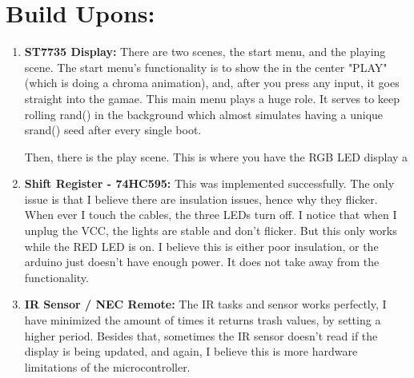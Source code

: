 \documentclass[12pt]{article}
\begin{document}
\section{Build Upons:}
\begin{enumerate}
  \item \textbf{ST7735 Display:}
    There are two scenes, the start menu, and the playing scene.
    The start menu's functionality is to show the in the center "PLAY"
    (which is doing a chroma animation),
    and, after you press any input, it goes straight into the gamae.
    This main menu plays a huge role. It serves to keep rolling rand()
    in the background which almost simulates having
    a unique srand() seed after every single boot.

    Then, there is the play scene. This is where you have the RGB LED
    display a
  \item \textbf{Shift Register - 74HC595:} This was implemented successfully.
    The only issue is that I believe there are insulation issues, hence why they flicker.
    When ever I touch the cables, the three LEDs turn off.
    I notice that when I unplug the VCC, the lights are stable and don't flicker.
    But this only works while the RED LED is on.
    I believe this is either poor insulation, or the arduino
    just doesn't have enough power. It does not take away from the functionality.
  \item \textbf{IR Sensor / NEC Remote:}
    The IR tasks and sensor works perfectly,
    I have minimized the amount of times it returns trash values, by setting a higher
    period. Besides that, sometimes the IR sensor doesn't read if the display is being updated,
    and again, I believe this is more hardware limitations of the microcontroller.
\end{enumerate}

\pagebreak
\end{document}
